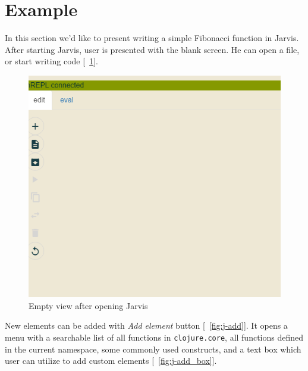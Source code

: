 \documentclass[english,mgr,shortabstract]{iithesis}
\newcommand*{\figref}[1]{[\textbf{\figurename}~\ref{#1}]}
\begin{document}
\section{Example}
In this section we'd like to present writing a simple Fibonacci function in Jarvis.
After starting Jarvis, user is presented with the blank screen. He can open a file, or
start writing code \figref{fig:j-startup}. 

\begin{figure}[hbt]
  \centering
  \includegraphics[scale=0.3]{img/j-startup}
  \caption{Empty view after opening Jarvis}
\label{fig:j-startup}
\end{figure}

New elements can be added with \textit{Add element} button \figref{fig:j-add}.
It opens a menu with a searchable list of all functions in
\lstinline{clojure.core}, all
functions defined in the current namespace, some commonly used constructs, and a text
box which user can utilize to add custom elements \figref{fig:j-add_box}.
\end{document}
